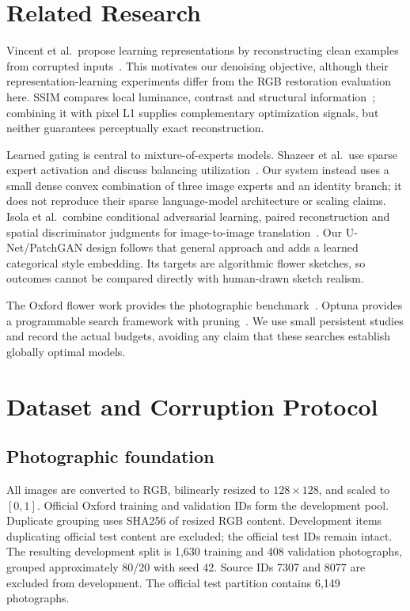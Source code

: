 \documentclass[conference]{IEEEtran}
\begin{document}
\section{Related Research}
Vincent et al.\ propose learning representations by reconstructing clean examples from corrupted inputs~\cite{vincent}. This motivates our denoising objective, although their representation-learning experiments differ from the RGB restoration evaluation here. SSIM compares local luminance, contrast and structural information~\cite{ssim}; combining it with pixel L1 supplies complementary optimization signals, but neither guarantees perceptually exact reconstruction.

Learned gating is central to mixture-of-experts models. Shazeer et al.\ use sparse expert activation and discuss balancing utilization~\cite{moe}. Our system instead uses a small dense convex combination of three image experts and an identity branch; it does not reproduce their sparse language-model architecture or scaling claims. Isola et al.\ combine conditional adversarial learning, paired reconstruction and spatial discriminator judgments for image-to-image translation~\cite{pix2pix}. Our U-Net/PatchGAN design follows that general approach and adds a learned categorical style embedding. Its targets are algorithmic flower sketches, so outcomes cannot be compared directly with human-drawn sketch realism.

The Oxford flower work provides the photographic benchmark~\cite{flowers}. Optuna provides a programmable search framework with pruning~\cite{optuna}. We use small persistent studies and record the actual budgets, avoiding any claim that these searches establish globally optimal models.

\section{Dataset and Corruption Protocol}
\subsection{Photographic foundation}
All images are converted to RGB, bilinearly resized to $128\times128$, and scaled to $[0,1]$. Official Oxford training and validation IDs form the development pool. Duplicate grouping uses SHA256 of resized RGB content. Development items duplicating official test content are excluded; the official test IDs remain intact. The resulting development split is 1,630 training and 408 validation photographs, grouped approximately 80/20 with seed 42. Source IDs 7307 and 8077 are excluded from development. The official test partition contains 6,149 photographs.
\end{document}
